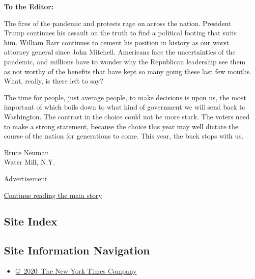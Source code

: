 \textbf{To the Editor:}

The fires of the pandemic and protests rage on across the nation.
President Trump continues his assault on the truth to find a political
footing that suits him. William Barr continues to cement his position in
history as our worst attorney general since John Mitchell. Americans
face the uncertainties of the pandemic, and millions have to wonder why
the Republican leadership see them as not worthy of the benefits that
have kept so many going these last few months. What, really, is there
left to say?

The time for people, just average people, to make decisions is upon us,
the most important of which boils down to what kind of government we
will send back to Washington. The contrast in the choice could not be
more stark. The voters need to make a strong statement, because the
choice this year may well dictate the course of the nation for
generations to come. This year, the buck stops with us.

Bruce Neuman\\
Water Mill, N.Y.

Advertisement

\protect\hyperlink{after-bottom}{Continue reading the main story}

\hypertarget{site-index}{%
\subsection{Site Index}\label{site-index}}

\hypertarget{site-information-navigation}{%
\subsection{Site Information
Navigation}\label{site-information-navigation}}

\begin{itemize}
\tightlist
\item
  \href{https://help.nytimes3xbfgragh.onion/hc/en-us/articles/115014792127-Copyright-notice}{©~2020~The
  New York Times Company}
\end{itemize}

